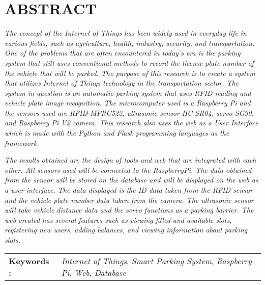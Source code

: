 \chapter*{ABSTRACT}

\textit{The concept of the Internet of Things has been widely used in everyday life in various fields, such as agriculture, health, industry, security, and transportation. One of the problems that are often encountered in today's era is the parking system that still uses conventional methods to record the license plate number of the vehicle that will be parked. The purpose of this research is to create a system that utilizes Internet of Things technology in the transportation sector. The system in question is an automatic parking system that uses RFID reading and vehicle plate image recognition. The microcomputer used is a Raspberry Pi and the sensors used are RFID MFRC522, ultrasonic sensor HC-SR04, servo SG90, and Raspberry Pi V2 camera. This research also uses the web as a User Interface which is made with the Python and Flask programming languages as the framework.}

\textit{The results obtained are the design of tools and web that are integrated with each other. All sensors used will be connected to the RaspberryPi. The data obtained from the sensor will be stored on the database and will be displayed on the web as a user interface. The data displayed is the ID data taken from the RFID sensor and the vehicle plate number data taken from the camera. The ultrasonic sensor will take vehicle distance data and the servo functions as a parking barrier. The web created has several features such as viewing filled and available slots, registering new users, adding balances, and viewing information about parking slots.}

\begin{table}[h]
    \begin{tabular}{ p{} p{} }
        \\
        \textbf{Keywords :} & \textit{Internet of Things}, \textit{Smart Parking System}, \textit{Raspberry Pi}, \textit{Web}, \textit{Database}
    \end{tabular}
\end{table}